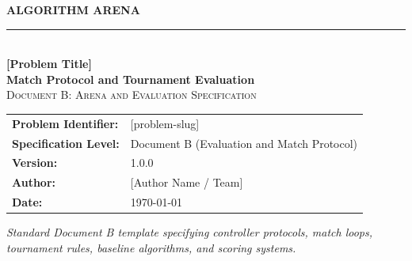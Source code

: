 \documentclass[11pt,a4paper]{article}
\newcommand{\problemname}{[Problem Title]}
\newcommand{\shortname}{[problem-slug]}
\newcommand{\problemversion}{1.0.0}
\newcommand{\problemauthor}{[Author Name / Team]}
\newcommand{\problemdate}{\today}
\begin{document}
\hypersetup{pageanchor=false}
\begin{titlepage}

    \centering
    \vspace*{1.0cm}

    {\Large\textbf{\color{arenaBlue}ALGORITHM ARENA}}\\[0.4cm]
    {\color{codegray!60}\rule{0.5\textwidth}{0.8pt}}\\[1.2cm]

    {\fontsize{26}{34}\selectfont\textbf{\problemname}}\\[0.4cm]
    {\Large\color{arenaBlue}\textbf{Match Protocol and Tournament Evaluation}}\\[1.2cm]

    {\large\textsc{Document B: Arena and Evaluation Specification}}\\[1.5cm]

    \begin{tabular}{ll}
        \toprule
        \textbf{Problem Identifier:} & \shortname \\
        \textbf{Specification Level:}& Document B (Evaluation and Match Protocol) \\
        \textbf{Version:}            & \problemversion \\
        \textbf{Author:}             & \problemauthor \\
        \textbf{Date:}               & \problemdate \\
        \bottomrule
    \end{tabular}

    \vfill

    \parbox{0.85\textwidth}{
        \centering\textit{
            Standard Document B template specifying controller protocols,
            match loops, tournament rules, baseline algorithms, and scoring systems.
        }
    }

\end{titlepage}
\hypersetup{pageanchor=true}

\tableofcontents
\newpage
{}

\end{document}
